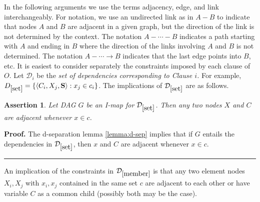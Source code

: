 \documentclass{elsarticle}%
\newtheorem{assertion}[theorem]{Assertion}
\renewenvironment{proof}[1][Proof]{\noindent\textbf{#1.} }{\ \rule{0.5em}{0.5em}}
\newcommand{\dep}{\ensuremath{{\perp{}\!\!\!\!\!\!\!\not  \perp{}}}}
\renewcommand{\S}{\mathbf{{S}}}
\newcommand{\A}{A}
\newcommand{\B}{B}
\newcommand{\D}{\mathcal{D}}
\begin{document}
In the following arguments we use the terms adjacency, edge, and link interchangeably.
For notation, we use an undirected link as in $\A - \B$ to indicate that nodes $\A$ and $\B$ are adjacent in a given graph, but the direction of the link is not determined by the context. The notation $\A - \cdots -\B$ indicates a path starting with $\A$ and ending in $\B$ where the direction of the links involving $\A$ and $\B$ is not determined. The notation $\A - \cdots \rightarrow \B$ indicates that  the last edge points into $\B$, etc. 
It is easiest to consider separately the constraints
imposed by each clause of $O$. Let $\D_i$ be the {\em set of dependencies corresponding to Clause $i$.} For example, $D_{\ref{set}} = \{\langle C_i, X_j, \S \rangle: x_j \in c_i\}$. 
The implications of $\D_{\ref{set}}$ are as follows.

\begin{assertion} \label{ass:adjacency}
Let DAG $G$ be an I-map for $\D_{\ref{set}}$. Then any two
nodes $X$ and $C$ are adjacent whenever
$ x \in c$.
\end{assertion}
\begin{proof} The d-separation lemma \ref{lemma:d-sep} implies that if
$G$ entails the dependencies in $\D_{\ref{set}}$, then $x$ and $C$ are adjacent
whenever $x \in c$. \end{proof}

An implication of the constraints in
$\D_{\ref{member}}$ is that any two element nodes $X_{i}, X_{j}$
with $x_{i}, x_{j}$ contained in the same set $c$ are adjacent to each
other or have variable $C$ as a common child (possibly both may be the case).
\end{document}
